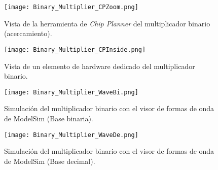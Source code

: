 \begin{figure}[ht]
	\centering
	\texttt{[image: Binary\_Multiplier\_CPZoom.png]}
	\caption{Vista de la herramienta de \textit{Chip Planner} del multiplicador binario (acercamiento). \label{fig:binary_multiplier_CPZoom}}
\end{figure}

\begin{figure}[ht]
	\centering
	\texttt{[image: Binary\_Multiplier\_CPInside.png]}
	\caption{Vista de un elemento de hardware dedicado del multiplicador binario. \label{fig:binary_multiplier_CPInside}}
\end{figure}

\begin{figure}[ht]
	\centering
	\texttt{[image: Binary\_Multiplier\_WaveBi.png]}
	\caption{Simulación del multiplicador binario con el visor de formas de onda de ModelSim (Base binaria). \label{fig:binary_multiplier_WaveBi}}
\end{figure}

\begin{figure}[ht]
	\centering
	\texttt{[image: Binary\_Multiplier\_WaveDe.png]}
	\caption{Simulación del multiplicador binario con el visor de formas de onda de ModelSim (Base decimal). \label{fig:binary_multiplier_WaveDe}}
\end{figure}
